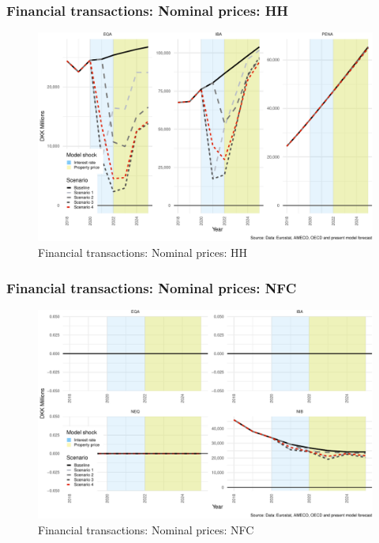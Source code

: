 \documentclass[
]{book}
\begin{document}
\hypertarget{financial-transactions-nominal-prices-hh}{%
\subsubsection{Financial transactions: Nominal prices: HH}\label{financial-transactions-nominal-prices-hh}}

\begin{figure}
\centering
\includegraphics{figures/fl-fi-sfc-plot-fin-tr-HH-1.pdf}
\caption{\label{fig:fl-fi-sfc-plot-fin-tr-HH}Financial transactions: Nominal prices: HH}
\end{figure}

\hypertarget{financial-transactions-nominal-prices-nfc}{%
\subsubsection{Financial transactions: Nominal prices: NFC}\label{financial-transactions-nominal-prices-nfc}}

\begin{figure}
\centering
\includegraphics{figures/fl-fi-sfc-plot-fin-tr-NFC-1.pdf}
\caption{\label{fig:fl-fi-sfc-plot-fin-tr-NFC}Financial transactions: Nominal prices: NFC}
\end{figure}
\end{document}
